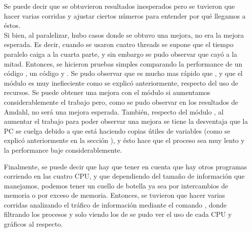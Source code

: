Se puede decir que se obtuvieron resultados inesperados pero se tuvieron que hacer
varias corridas y ajustar ciertos números para entender por qué llegamos a
éstos.\\
Si bien, al paralelizar, hubo casos donde se obtuvo una mejora, no era la mejora
esperada. Es decir, cuando se usaron cuatro threads se supone que el tiempo paralelo
caiga a la cuarta parte, y sin embargo se pudo observar que cayó a la mitad. Entonces,
se hicieron pruebas simples comparando la performance de un código , un
código  y . Se pudo observar que 
es mucho mas rápido que , y que el módulo  es muy inefieciente
como se explicó anteriormente, respecto del uso de recursos. Se puede obtener una mejora
con el módulo  si aumentamos considerablemente el trabajo pero, como
se pudo observar en los resultados de Amdahl, no será una mejora esperada.
También, respecto del módulo , al aumentar el trabajo para poder observar
una mejora se tiene la desventaja que la PC se cuelga debido a que 
está haciendo copias útiles de variables (como se explicó anteriormente en la
sección ), y ésto hace que el proceso sea muy lento
y la performance baje considerablemente.

Finalmente, se puede decir que hay que tener en cuenta que hay otros programas
corriendo en las cuatro CPU, y que dependiendo del tamaño de información que
manejamos, podemos tener un cuello de botella ya sea por intercambios de memoria
o por exceso de memoria.
Entonces, se tuvieron que hacer varias corridas analizando el tráfico de
información mediante el comando , donde filtrando
los procesos y solo viendo los de  se pudo ver el uso de cada CPU
y gráficos al respecto.
